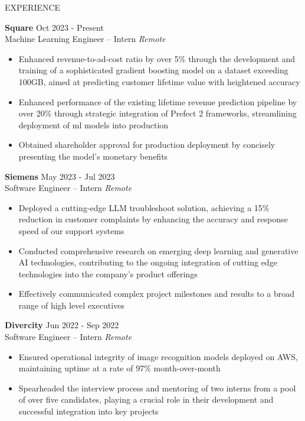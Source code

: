\documentclass{resume} %
\begin{document}
\begin{rSection}{EXPERIENCE}

    \textbf{Square} \hfill Oct 2023 - Present\\
    Machine Learning Engineer -- Intern \hfill \textit{Remote}
     \begin{itemize}
        \itemsep -3pt {} 
        \item Enhanced revenue-to-ad-cost ratio by over 5\% through the development and training of a sophisticated gradient boosting model on a dataset exceeding 100GB, aimed at predicting customer lifetime value with heightened accuracy
        \item Enhanced performance of the existing lifetime revenue prediction pipeline by over 20\% through strategic integration of Prefect 2 frameworks, streamlining deployment of ml models into production
        \item Obtained shareholder approval for production deployment by concisely presenting the model's monetary benefits
     \end{itemize}
     
    \textbf{Siemens} \hfill May 2023 - Jul 2023\\
    Software Engineer -- Intern \hfill \textit{Remote}
     \begin{itemize}
        \itemsep -3pt {} 
        \item Deployed a cutting-edge LLM troubleshoot solution, achieving a 15\% reduction in customer complaints by enhancing the accuracy and response speed of our support systems
        \item Conducted comprehensive research on emerging deep learning and generative AI technologies, contributing to the ongoing integration of cutting edge technologies into the company's product offerings
        \item Effectively communicated complex project milestones and results to a broad range of high level executives
     \end{itemize}
    
    \textbf{Divercity} \hfill Jun 2022 - Sep 2022\\
    Software Engineer -- Intern \hfill \textit{Remote}
     \begin{itemize}
        \itemsep -3pt {} 
        \item Ensured operational integrity of image recognition models deployed on AWS, maintaining uptime at a rate of 97\% month-over-month
        \item Spearheaded the interview process and mentoring of two interns from a pool of over five candidates, playing a crucial role in their development and successful integration into key projects
     \end{itemize}
    
    \end{rSection}
    
\end{document}
